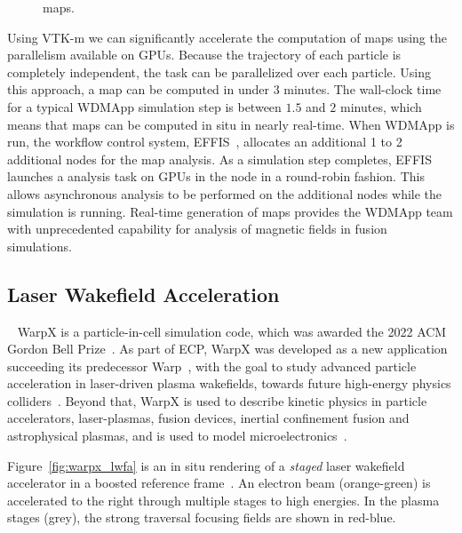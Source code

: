 \begin{figure}[ht]
  \centering
  \caption{\poincare maps.}
  \label{fig:poincare}
\end{figure}

Using VTK-m we can significantly accelerate the computation of \poincare maps using the parallelism available on GPUs. Because the trajectory of each particle is completely independent, the task can be parallelized over each particle. Using this approach, a \poincare map can be computed in under $3$ minutes. The wall-clock time for a typical WDMApp simulation step is between $1.5$ and $2$ minutes, which means that \poincare maps can be computed in situ in nearly real-time.
When WDMApp is run, the workflow control system, EFFIS~\cite{Suchyta2022-effis}, allocates an additional 1 to 2 additional nodes for the \poincare map analysis. As a simulation step completes, EFFIS launches a \poincare analysis task on GPUs in the node in a round-robin fashion. This allows asynchronous analysis to be performed on the additional nodes while the simulation is running.
Real-time generation of \poincare maps provides the WDMApp team with unprecedented capability for analysis of magnetic fields in fusion simulations.




\subsection{Laser Wakefield Acceleration}\label{sec:warpx}

~%
%
%
WarpX is a particle-in-cell simulation code, which was awarded the 2022 ACM Gordon Bell Prize~\cite{FedeliHuebl2022}.
As part of ECP, WarpX was developed as a new application succeeding its predecessor Warp~\cite{Vay2013}, with the goal to study advanced particle acceleration in laser-driven plasma wakefields, towards future high-energy physics colliders~\cite{Albert2021}.
Beyond that, WarpX is used to describe kinetic physics in particle accelerators, laser-plasmas, fusion devices, inertial confinement fusion and astrophysical plasmas, and is used to model microelectronics~\cite{Yao2022}.

Figure~\ref{fig:warpx_lwfa} is an in situ rendering of a \emph{staged} laser wakefield accelerator in a boosted reference frame~\cite{Vay2011}.
An electron beam (orange-green) is accelerated to the right through multiple stages to high energies.
In the plasma stages (grey), the strong traversal focusing fields are shown in red-blue.

